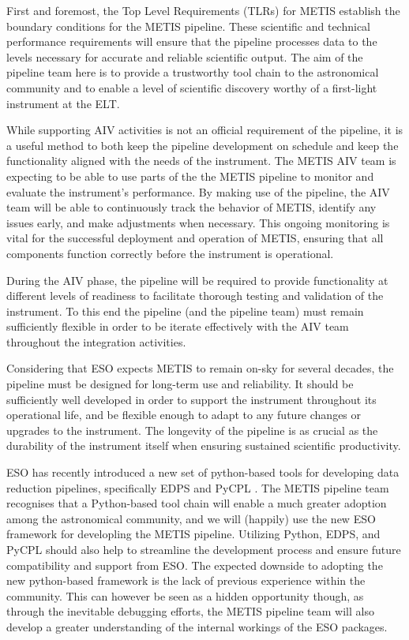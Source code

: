 \documentclass[a4paper]{spie}  %
\begin{document}
First and foremost, the Top Level Requirements (TLRs) for METIS \cite{ESO-257869} establish the boundary conditions for the METIS pipeline.
These scientific and technical performance requirements will ensure that the pipeline processes data to the levels necessary for accurate and reliable scientific output. 
The aim of the pipeline team here is to provide a trustworthy tool chain to the astronomical community and to enable a level of scientific discovery worthy of a first-light instrument at the ELT. 

While supporting AIV activities is not an official requirement of the pipeline, it is a useful method to both keep the pipeline development on schedule and keep the functionality aligned with the needs of the instrument. 
The METIS AIV team is expecting to be able to use parts of the the METIS pipeline to monitor and evaluate the instrument's performance.
By making use of the pipeline, the AIV team will be able to continuously track the behavior of METIS, identify any issues early, and make adjustments when necessary. 
This ongoing monitoring is vital for the successful deployment and operation of METIS, ensuring that all components function correctly before the instrument is operational.

During the AIV phase, the pipeline will be required to provide functionality at different levels of readiness to facilitate thorough testing and validation of the instrument. 
To this end the pipeline (and the pipeline team) must remain sufficiently flexible in order to be iterate effectively with the AIV team throughout the integration activities.

Considering that ESO expects METIS to remain on-sky for several decades, the pipeline must be designed for long-term use and reliability. 
It should be sufficiently well developed in order to support the instrument throughout its operational life, and be flexible enough to adapt to any future changes or upgrades to the instrument. 
The longevity of the pipeline is as crucial as the durability of the instrument itself when ensuring sustained scientific productivity.

ESO has recently introduced a new set of python-based tools for developing data reduction pipelines, specifically EDPS \cite{edps} and PyCPL \cite{pycpl}. 
The METIS pipeline team recognises that a Python-based tool chain will enable a much greater adoption among the astronomical community, and we will (happily) use the new ESO framework for developling the METIS pipeline. 
Utilizing Python, EDPS, and PyCPL should also help to streamline the development process and ensure future compatibility and support from ESO.
The expected downside to adopting the new python-based framework is the lack of previous experience within the community.
This can however be seen as a hidden opportunity though, as through the inevitable debugging efforts, the METIS pipeline team will also develop a greater understanding of the internal workings of the ESO packages.
\end{document}
